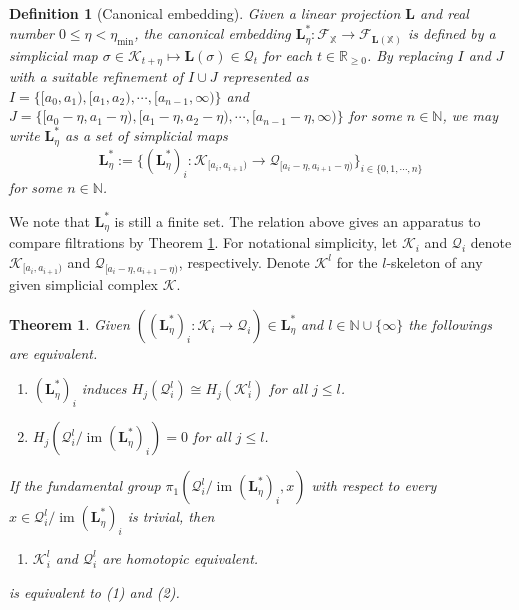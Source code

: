\documentclass[11pt]{article}
\newtheorem{theorem}{Theorem}[section]
\newtheorem{definition}{Definition}
\newcommand{\N}{\mathbb{N}} %
\newcommand{\R}{\mathbb{R}} %
\newcommand{\im}{\operatorname{im}}
\newcommand{\matL}{\mathbf{L}} %
\newcommand{\ptcloudx}{\mathbb{X}} %
\begin{document}
\begin{definition}[Canonical embedding]\label{canon_emb}
	Given a linear projection $\matL$ and real number $0 \leq \eta<\eta_{\min}$, the \emph{canonical embedding} $\matL^{\ast}_{\eta}:\mathcal{F}_{\ptcloudx}\to \mathcal{F}_{\mathbf{L}(\ptcloudx)}$ is defined by a simplicial map $\sigma \in \mathcal{K}_{t+\eta} \mapsto \matL(\sigma) \in \mathcal{Q}_{t}$ for each $t \in \R_{\geq0}$. By replacing $I$ and $J$ with a suitable refinement of $I \cup J$ represented as $I=\{[a_{0},a_{1}),[a_{1},a_{2}), \cdots, [a_{n-1}, \infty) \}$ and $J= \{[a_{0}-\eta,a_{1}-\eta),[a_{1}-\eta,a_{2}-\eta), \cdots, [a_{n-1}-\eta, \infty) \}$ for some $n \in \N$, we may write $\matL^{\ast}_{\eta}$ as a set of simplicial maps
	$$\matL^{\ast}_{\eta}:=\{ \left(\matL^{\ast}_{\eta}\right)_{i}:\mathcal{K}_{[a_{i},a_{i+1}) } \to \mathcal{Q}_{[a_{i}-\eta,a_{i+1}-\eta)}\}_{ i \in \{0,1, \cdots, n\} }$$ 
	for some $n \in \N$.
\end{definition}
We note that $\matL^{\ast}_{\eta}$ is still a finite set. The relation above gives an apparatus to compare filtrations by Theorem \ref{classification_thm}. For notational simplicity, let $\mathcal{K}_{i}$ and $\mathcal{Q}_{i}$ denote $\mathcal{K}_{[a_{i},a_{i+1}) }$ and $\mathcal{Q}_{[a_{i}-\eta,a_{i+1}-\eta)}$, respectively. Denote $\mathcal{K}^{l}$ for the $l$-skeleton of any given simplicial complex $\mathcal{K}$.
\begin{theorem}\label{classification_thm}
	Given $\left(\left(\matL^{\ast}_{\eta}\right)_{i}:\mathcal{K}_{i} \to \mathcal{Q}_{i}\right) \in \matL^{\ast}_{\eta}$ and $l \in \N \cup \{ \infty\}$ the followings are equivalent.
	\begin{enumerate}
		\item[(1)] $\left(\matL^{\ast}_{\eta}\right)_{i}$ induces $H_{j}(\mathcal{Q}_{i}^{l}) \cong H_{j}(\mathcal{K}_{i}^{l})$ for all $j \leq l$.
		\item[(2)] $H_{j}(\mathcal{Q}_{i}^{l}/\im\left(\matL^{\ast}_{\eta}\right)_{i})=0$ for all $j \leq l$.
	\end{enumerate}
	If the fundamental group $\pi_{1}(\mathcal{Q}_{i}^{l}/\im\left(\matL^{\ast}_{\eta}\right)_{i},x)$ with respect to every $x \in\mathcal{Q}_{i}^{l}/\im\left(\matL^{\ast}_{\eta}\right)_{i}$ is trivial, then
	\begin{enumerate}[resume]
		\item[(3)] $\mathcal{K}_{i}^{l}$ and $\mathcal{Q}_{i}^{l}$ are homotopic equivalent.
	\end{enumerate}
	is equivalent to (1) and (2).
\end{theorem}
\end{document}
